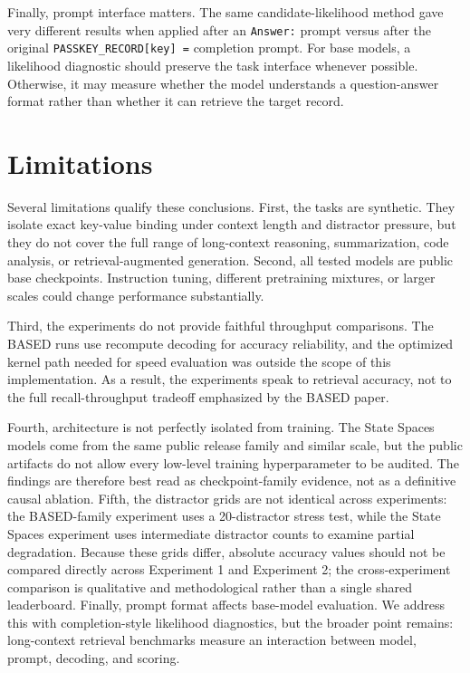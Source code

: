 \documentclass[10pt]{article}
\begin{document}
Finally, prompt interface matters. The same candidate-likelihood method gave
very different results when applied after an \texttt{Answer:} prompt versus
after the original \texttt{PASSKEY\_RECORD[key] =} completion prompt. For base
models, a likelihood diagnostic should preserve the task interface whenever
possible. Otherwise, it may measure whether the model understands a
question-answer format rather than whether it can retrieve the target record.

\section{Limitations}

Several limitations qualify these conclusions. First, the tasks are synthetic.
They isolate exact key-value binding under context length and distractor
pressure, but they do not cover the full range of long-context reasoning,
summarization, code analysis, or retrieval-augmented generation. Second, all
tested models are public base checkpoints. Instruction tuning, different
pretraining mixtures, or larger scales could change performance substantially.

Third, the experiments do not provide faithful throughput comparisons. The
BASED runs use recompute decoding for accuracy reliability, and the optimized
kernel path needed for speed evaluation was outside the scope of this
implementation. As a result, the experiments speak to retrieval accuracy, not
to the full recall-throughput tradeoff emphasized by the BASED paper.

Fourth, architecture is not perfectly isolated from training. The State Spaces
models come from the same public release family and similar scale, but the
public artifacts do not allow every low-level training hyperparameter to be
audited. The findings are therefore best read as checkpoint-family evidence,
not as a definitive causal ablation. Fifth, the distractor grids are not
identical across experiments: the BASED-family experiment uses a 20-distractor
stress test, while the State Spaces experiment uses intermediate distractor
counts to examine partial degradation. Because these grids differ, absolute
accuracy values should not be compared directly across Experiment 1 and
Experiment 2; the cross-experiment comparison is qualitative and
methodological rather than a single shared leaderboard. Finally, prompt format
affects base-model evaluation. We address this with completion-style likelihood
diagnostics, but the broader point remains: long-context retrieval benchmarks
measure an interaction between model, prompt, decoding, and scoring.
\end{document}
